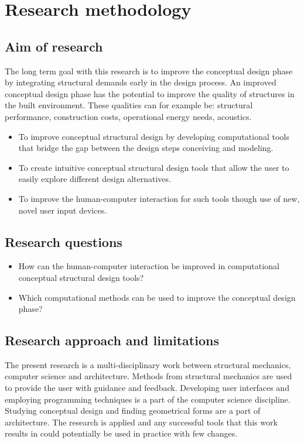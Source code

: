 \section{Research methodology }
\subsection{Aim of research}
The long term goal with this research is to improve the conceptual design phase by integrating structural demands early in the design process. An improved conceptual design phase has the potential to improve the quality of structures in the built environment. These qualities can for example be: structural performance, construction costs, operational energy needs, acoustics.


\begin{itemize}  
\item To improve conceptual structural design by developing computational tools that bridge the gap between the design steps conceiving and modeling.
\item  To create intuitive conceptual structural design tools that allow the user to easily explore different design alternatives.
\item To improve the human-computer interaction for such tools though use of new, novel user input devices. 
\end{itemize}


\subsection{Research questions}
\begin{itemize}  
\item How can the human-computer interaction be improved in computational conceptual structural design tools?
\item  Which computational methods can be used to improve the conceptual design phase? 
\end{itemize}

\subsection{Research approach and limitations}
The present research is a multi-disciplinary work between structural mechanics, computer science and architecture. Methods from structural mechanics are used to provide the user with guidance and feedback. Developing user interfaces and employing programming techniques is a part of the computer science discipline. Studying conceptual design and finding geometrical forms are a part of architecture. The research is applied and any successful tools that this work results in could potentially be used in practice with few changes.

